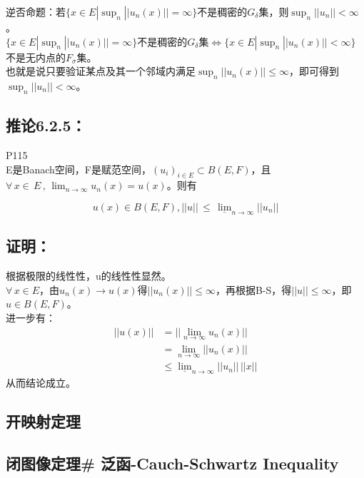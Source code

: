 \documentclass[
]{article}
\begin{document}
逆否命题：若\(\{x \in E| \sup_{n} ||u_{n}(x)||=\infty \}\)不是稠密的\(G_{\delta}\)集，则\(\sup_{n}||u_{n}||<\infty\)。\\
\(\{x \in E| \sup_{n} ||u_{n}(x)||=\infty \}\)不是稠密的\(G_{\delta}\)集\(\Leftrightarrow\)\(\{x \in E| \sup_{n} ||u_{n}(x)||<\infty \}\)不是无内点的\(F_{\sigma}\)集。\\
也就是说只要验证某点及其一个邻域内满足\(\sup_{n}||u_{n}(x)||\leq\infty\)，即可得到\(\sup_{n}||u_{n}||<\infty\)。

\hypertarget{ux63a8ux8bba625}{%
\subsection{\texorpdfstring{\textbf{推论6.2.5：}}{推论6.2.5：}}\label{ux63a8ux8bba625}}

P115 \\
E是Banach空间，F是赋范空间，\((u_{i})_{i \in E} \subset B(E,F)\)，且\(\forall \, x \in \, E \, , \, \lim_{n \rightarrow \infty}u_{n}(x) =u(x)\)。则有

\[u(x)\in B(E,F),||u|| \, \leq \, \underline\lim_{n\rightarrow\infty}||u_{n}||\]

\hypertarget{ux8bc1ux660e-2}{%
\subsection{\texorpdfstring{\textbf{证明：}
}{证明： }}\label{ux8bc1ux660e-2}}

根据极限的线性性，u的线性性显然。\\
\(\forall \, x\in E\)，由\(u_{n}(x)\rightarrow u(x)\)得\(||u_{n}(x)||\leq\infty\)，再根据B-S，得\(||u||\leq \infty\)，即\(u\in B(E,F)\)。\\
进一步有：
\[
\begin{aligned}
||u(x)||&=||\lim_{n\rightarrow\infty}u_{n}(x)||\\
&=\lim_{n\rightarrow\infty}||u_{n}(x)||\\
&\leq \underline\lim_{n\rightarrow \infty}||u_{n}||\, ||x||
\end{aligned}
\]
从而结论成立。

\hypertarget{ux5f00ux6620ux5c04ux5b9aux7406}{%
\subsection{开映射定理}\label{ux5f00ux6620ux5c04ux5b9aux7406}}

\hypertarget{ux95edux56feux50cfux5b9aux7406-ux6cdbux51fd-cauch-schwartz-inequality}{%
\subsection{闭图像定理\# 泛函-Cauch-Schwartz
Inequality}\label{ux95edux56feux50cfux5b9aux7406-ux6cdbux51fd-cauch-schwartz-inequality}}
\end{document}
